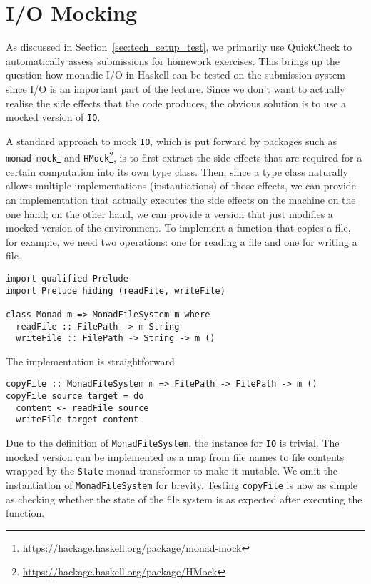 \section{I/O Mocking}
As discussed in Section~\ref{sec:tech_setup_test}, we primarily use QuickCheck to automatically assess submissions for homework exercises.
This brings up the question how monadic I/O in Haskell can be tested on the submission system since I/O is an important part of the lecture.
Since we don't want to actually realise the side effects that the code produces, the obvious solution is to use a mocked version of \texttt{IO}.

A standard approach to mock \texttt{IO}, which is put forward by packages such as \texttt{monad-mock}\footnote{\url{https://hackage.haskell.org/package/monad-mock}} and \texttt{HMock}\footnote{\url{https://hackage.haskell.org/package/HMock}}, is to first extract the side effects that are required for a certain computation into its own type class.
Then, since a type class naturally allows multiple implementations (instantiations) of those effects, we can provide an implementation that actually executes the side effects on the machine on the one hand; on the other hand, we can provide a version that just modifies a mocked version of the environment. 
To implement a function that copies a file, for example, we need two operations: one for reading a file and one for writing a file.
\begin{verbatim}
import qualified Prelude
import Prelude hiding (readFile, writeFile)

class Monad m => MonadFileSystem m where
  readFile :: FilePath -> m String
  writeFile :: FilePath -> String -> m ()
\end{verbatim}
The implementation is straightforward.
\begin{verbatim}
copyFile :: MonadFileSystem m => FilePath -> FilePath -> m ()
copyFile source target = do
  content <- readFile source
  writeFile target content
\end{verbatim}
Due to the definition of \texttt{MonadFileSystem}, the instance for \texttt{IO} is trivial. 
The mocked version can be implemented as a map from file names to file contents wrapped by the \texttt{State} monad transformer to make it mutable.
We omit the instantiation of \texttt{MonadFileSystem} for brevity.
Testing \texttt{copyFile} is now as simple as checking whether the state of the file system is as expected after executing the function.
